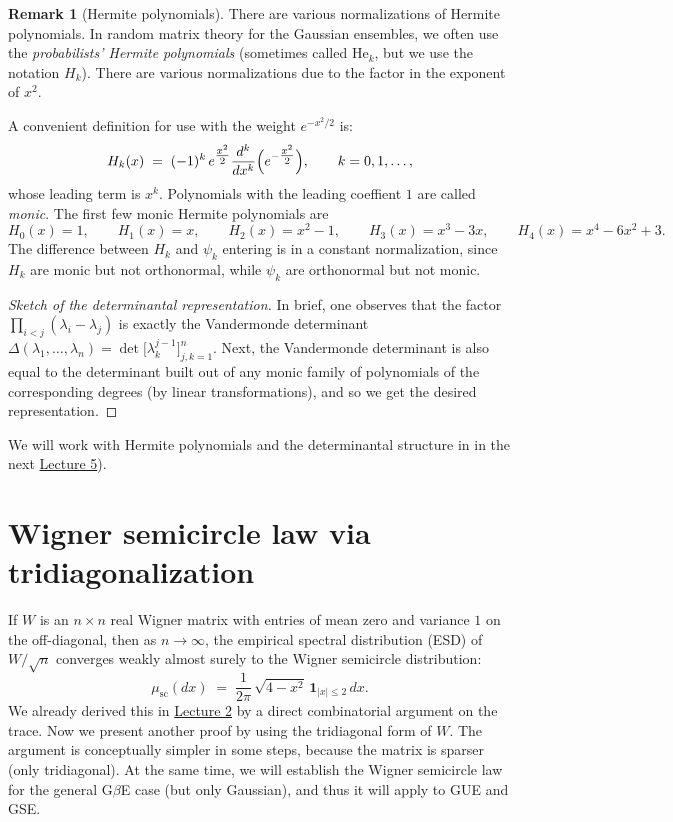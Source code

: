 \documentclass[letterpaper,11pt,oneside,reqno]{article}
\numberwithin{equation}{section}
\theoremstyle{definition}
\newtheorem{remark}[proposition]{Remark}
\begin{document}
\begin{remark}[Hermite polynomials]
  There are various normalizations of Hermite polynomials.
  In random matrix theory for the Gaussian ensembles,
  we often use the \emph{probabilists' Hermite polynomials}
	(sometimes called \(\mathrm{He}_k\), but we use the notation $H_k$).
	There are various normalizations due to the factor in the exponent
	of $x^2$.

  A convenient definition for use with the weight \(e^{-x^2/2}\) is:
	\begin{equation}
		\label{eq:hermite-polynomial}
    H_k(x)
    \;=\;
    (-1)^k\, e^{\tfrac{x^2}{2}}
    \frac{d^k}{dx^k}
    \Bigl(e^{-\tfrac{x^2}{2}}\Bigr),
		\qquad
		k=0,1,\ldots,
\end{equation}
  whose leading term is \(x^k\).
	Polynomials with the leading coeffient \(1\) are called \emph{monic}.
	The first few monic Hermite polynomials are
	\[
		H_0(x) = 1,\qquad
		H_1(x) = x,\qquad
		H_2(x) = x^2 - 1,\qquad
		H_3(x) = x^3 - 3x,\qquad
		H_4(x) = x^4 - 6x^2 + 3.
	\]
	The difference between $H_k$ and $\psi_k$ entering 
	is in a constant normalization,
	since $H_k$ are monic but not orthonormal,
	while $\psi_k$ are orthonormal but not monic.
\end{remark}

\begin{proof}[Sketch of the determinantal representation]
  In brief, one observes that the factor
  \(\prod_{i<j}(\lambda_i - \lambda_j)\)
  is exactly the Vandermonde determinant
  \(\Delta(\lambda_1,\dots,\lambda_n)
  = \det\bigl[\lambda_k^{j-1}\bigr]_{j,k=1}^n\).
	Next, the Vandermonde determinant is also equal to
	the determinant built out of any monic family of polynomials of the corresponding
	degrees (by linear transformations), and so we get the desired
	representation.
\end{proof}

We will work with Hermite polynomials
and the determinantal structure in 
in the next
\href{https://lpetrov.cc/rmt25/rmt25-notes/rmt2025-l05.pdf}{Lecture 5}).

\section{Wigner semicircle law via tridiagonalization}
\label{sec:semicircle-tridiagonal}


If $W$ is an $n\times n$ real Wigner matrix with entries of
mean zero and variance $1$ on the off-diagonal, then as
$n\to\infty$, the empirical spectral distribution (ESD) of
$W/\sqrt{n}$ converges weakly almost surely to the Wigner
semicircle distribution:
\[
  \mu_{\mathrm{sc}}(dx)
  \;=\;
  \frac{1}{2\pi}\,\sqrt{4 - x^2}\,\mathbf{1}_{|x|\le2}\,dx.
\]
We already derived this in
\href{https://lpetrov.cc/rmt25/rmt25-notes/rmt2025-l02.pdf}{Lecture 2}
by a direct combinatorial argument on the trace. Now we present another proof by using the tridiagonal form of $W$.  The argument is conceptually simpler in some steps, because the matrix is sparser (only tridiagonal).
At the same time, we will establish the Wigner
semicircle law for the general G$\beta$E case (but only Gaussian), and
thus it will apply to GUE and GSE.
\end{document}
